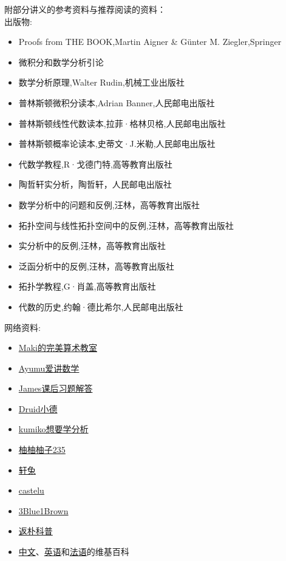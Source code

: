 \documentclass[12pt, a4paper, oneside]{ctexbook}
\begin{document}
\noindent
附部分讲义的参考资料与推荐阅读的资料：\\
出版物:
\begin{itemize}
  \item Proofs from THE BOOK,Martin Aigner \& Günter M. Ziegler,Springer
  \item 微积分和数学分析引论
  \item 数学分析原理,Walter Rudin,机械工业出版社
  \item 普林斯顿微积分读本,Adrian Banner,人民邮电出版社
  \item 普林斯顿线性代数读本,拉菲·格林贝格,人民邮电出版社
  \item 普林斯顿概率论读本,史蒂文·J.米勒,人民邮电出版社
  \item 代数学教程,R·戈德门特,高等教育出版社
  \item 陶哲轩实分析，陶哲轩，人民邮电出版社
  \item 数学分析中的问题和反例,汪林，高等教育出版社
  \item 拓扑空间与线性拓扑空间中的反例,汪林，高等教育出版社
  \item 实分析中的反例,汪林，高等教育出版社
  \item 泛函分析中的反例,汪林，高等教育出版社
  \item 拓扑学教程,G·肖盖,高等教育出版社
  \item 代数的历史,约翰·德比希尔,人民邮电出版社
\end{itemize}
网络资料:
\begin{itemize}
  \item \href{https://space.bilibili.com/391930545}{Maki的完美算术教室}
  \item \href{https://space.bilibili.com/1632276842}{Ayumu爱讲数学}
  \item \href{https://space.bilibili.com/29977151}{James课后习题解答}
  \item \href{https://space.bilibili.com/6073855}{Druid小德}
  \item \href{https://space.bilibili.com/3156848}{kumiko想要学分析}
  \item \href{https://space.bilibili.com/586867165}{柚柚柚子235}
  \item \href{https://space.bilibili.com/20883932}{轩兔}
  \item \href{https://space.bilibili.com/184538069}{castelu}
  \item \href{https://space.bilibili.com/88461692}{3Blue1Brown}
  \item \href{https://space.bilibili.com/415941398}{返朴科普}
  \item \href{https://zh.wikipedia.org/wiki/Wikipedia:%E9%A6%96%E9%A1%B5}{中文}、\href{https://en.wikipedia.org/wiki/Main_Page}{英语}和\href{https://fr.wikipedia.org/wiki/Wikip%C3%A9dia:Accueil_principal}{法语}的维基百科
\end{itemize}
\end{document}
